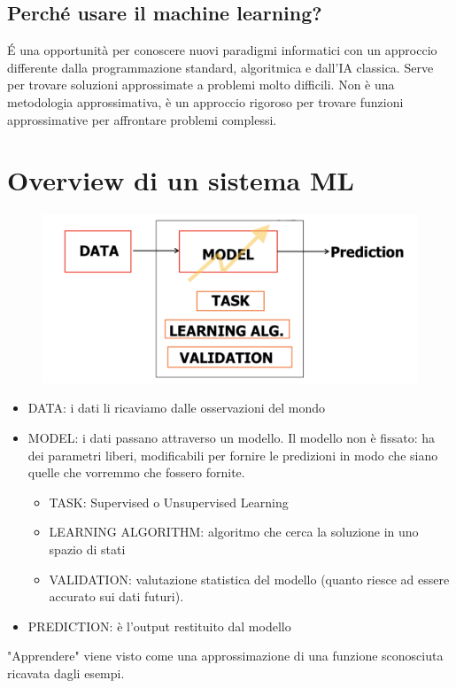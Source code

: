 \documentclass{article}
\begin{document}
\subsection{Perché usare il machine learning?}
É una opportunità per conoscere nuovi paradigmi informatici con un approccio differente dalla programmazione standard, algoritmica e dall'IA classica. Serve per trovare soluzioni approssimate a problemi molto difficili. Non è una metodologia approssimativa, è un approccio rigoroso per trovare funzioni approssimative per affrontare problemi complessi. 

\section{Overview di un sistema ML}
\begin{figure}[H]
    \centering
    \includegraphics[scale=0.5]{Images/modelloML.png}
\end{figure}

\begin{itemize}
    \item DATA: i dati li ricaviamo dalle osservazioni del mondo
    \item MODEL: i dati passano attraverso un modello. Il modello non è fissato: ha dei parametri liberi, modificabili per fornire le predizioni in modo che siano quelle che vorremmo che fossero fornite.
    \begin{itemize}
        \item TASK: Supervised o Unsupervised Learning
        \item LEARNING ALGORITHM: algoritmo che cerca la soluzione in uno spazio di stati
        \item VALIDATION: valutazione statistica del modello (quanto riesce ad essere accurato sui dati futuri). 
    \end{itemize}
    \item PREDICTION: è l'output restituito dal modello
\end{itemize} 
"Apprendere" viene visto come una approssimazione di una funzione sconosciuta ricavata dagli esempi. 
\end{document}
